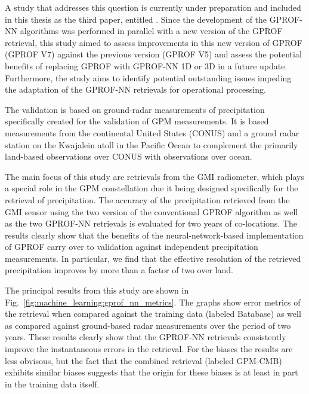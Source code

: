 A study that addresses this question is currently under preparation and included
in this thesis as the third paper, entitled . Since the
  development of the GPROF-NN algorithms was performed in parallel with a new
  version of the GPROF retrieval, this study aimed to assess improvements in
  this new version of GPROF (GPROF V7) against the previous version (GPROF V5)
  and assess the potential benefits of replacing GPROF with GPROF-NN 1D or 3D in
  a future update. Furthermore, the study aims to identify potential outstanding
  issues impeding the adaptation of the GPROF-NN retrievals for operational
  processing.

The validation is based on ground-radar measurements of precipitation
specifically created for the validation of GPM measurements. It is
based measurements from the continental United States (CONUS) and a ground radar
station on the Kwajalein atoll in the Pacific Ocean to complement the primarily
land-based observations over CONUS with observations over ocean.

The main focus of this study are retrievals from the GMI radiometer, which plays
a special role in the GPM constellation due it being designed specifically for
the retrieval of precipitation. The accuracy of the precipitation retrieved from
the GMI sensor using the two version of the conventional GPROF algorithm as well
as the two GPROF-NN retrievals is evaluated for two years of co-locations. The
results clearly show that the benefits of the neural-network-based
implementation of GPROF carry over to validation against independent
precipitation measurements. In particular, we find that the effective resolution
of the retrieved precipitation improves by more than a factor of two over land.

The principal results from this study are shown in
Fig.~\ref{fig:machine_learning:gprof_nn_metrics}. The graphs show error metrics
of the retrieval when compared against the training data (labeled Batabase) as
well as compared against ground-based radar measurements over the period of two
years. These results clearly show that the GPROF-NN retrievals consistently
improve the instantaneous errors in the retrieval. For the biases
the results are less obvisous, but the fact that the combined retrieval
(labeled GPM-CMB) exhibits similar biases suggests that the origin for these
biases is at least in part in the training data itself.

